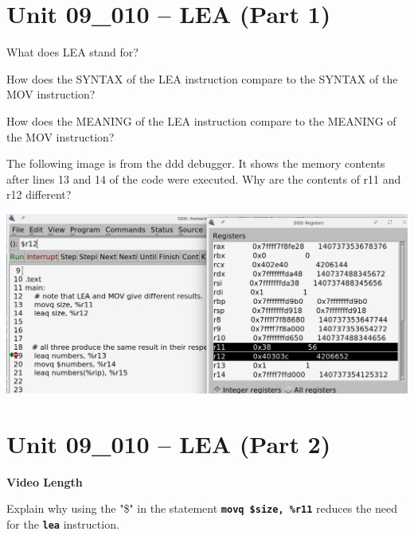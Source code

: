 \documentclass[letterpaper,12pt]{exam}
\newcommand{\unit}{Unit 09}
\begin{document}

\par{\selectfont\textbf{}}
\begin{questions}

\section*{\unit\_010 -- LEA (Part 1)}
\begin{samepage}
    \question What does LEA stand for?
    \vspace{5mm}
\end{samepage}
\par
\begin{samepage}
    \question How does the SYNTAX of the LEA instruction compare to the SYNTAX of the MOV instruction?
    \vspace{5mm}
\end{samepage}
\begin{samepage}
    \question How does the MEANING of the LEA instruction compare to the MEANING of the MOV instruction?
    \vspace{5mm}
\end{samepage}
\par
\begin{samepage}
    \question The following image is from the ddd debugger.  It shows the memory contents after lines 13 and 14 of the code were executed.  Why are the contents of r11 and r12 different?
   \begin{center}
    \includegraphics[width=\textwidth]{../../09_Stack/images/010_LeaVsMov.png}
   \end{center}
   \vspace{5mm}
\end{samepage}
\par
 \section*{\unit\_010 -- LEA (Part 2)}
 \par{\selectfont\textbf{Video Length }}
 \begin{samepage}
     \question Explain why using the "\$" in the statement  \texttt{\textbf{movq \$size, \%r11}} reduces the need for the \texttt{\textbf{lea}} instruction.
     \vspace{5mm}
 \end{samepage}
 \par
  

\end{questions}
\end{document}
